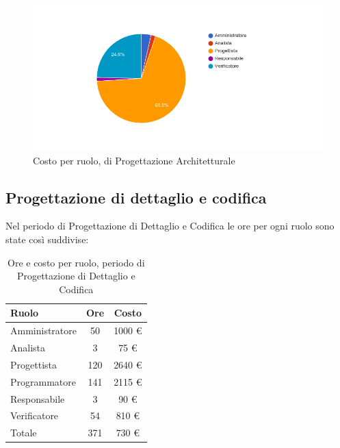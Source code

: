 \begin{figure}[H]
  \begin{center}
    \includegraphics[width=15cm]{res/img/prospettoEconomico/costoPerRuoloProgettazioneArchitetturale.png}
  \caption{Costo per ruolo,  di Progettazione Architetturale}
  \end{center} 
\end{figure}  


\subsection{Progettazione di dettaglio e codifica}
Nel periodo di Progettazione di Dettaglio e Codifica le ore per ogni ruolo sono state così suddivise:

\begin{table}[H]
	\centering
	\begin{tabular}{ l c c }
		\textbf{Ruolo} & \textbf{Ore} & \textbf{Costo} \\
		\hline
		Amministratore & 50 & 1000 \euro{} \\
		Analista & 3 & 75 \euro{} \\
		Progettista & 120 & 2640 \euro{} \\
		Programmatore & 141 & 2115 \euro{} \\
		Responsabile & 3 & 90 \euro{} \\
		Verificatore & 54 & 810 \euro{} \\
		\hline
		Totale & 371 & 730 \euro{} \\
		\hline
	\end{tabular}
	\caption{Ore e costo per ruolo, periodo di Progettazione di Dettaglio e Codifica}
\end{table}

